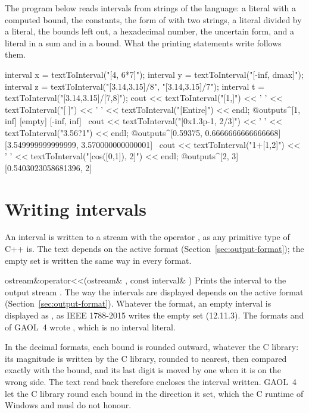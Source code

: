 \begin{Ex}
The program below reads intervals from strings of the language: a literal
with a computed bound, the constants, the form of 
with two strings, a literal divided by a literal, the bounds left out, a
hexadecimal number, the uncertain form, and a literal in a sum and in a
bound. What the printing statements write follows them.
\begin{example}
interval x = textToInterval("[4, 6*7]");
interval y = textToInterval("[-inf, dmax]");
interval z = textToInterval("[3.14,3.15]/8", "[3.14,3.15]/7");
interval t = textToInterval("[3.14,3.15]/[7,8]");
cout << textToInterval("[1,]") << ' ' << textToInterval("[ ]") << ' '
     << textToInterval("[Entire]") << endl;
@outputs^[1, inf] [empty] [-inf, inf]~
cout << textToInterval("[0x1.3p-1, 2/3]") << ' '
     << textToInterval("3.56?1") << endl;
@outputs^[0.59375, 0.6666666666666668] [3.549999999999999, 3.570000000000001]~
cout << textToInterval("1+[1,2]") << ' '
     << textToInterval("[cos([0,1]), 2]") << endl;
@outputs^[2, 3] [0.5403023058681396, 2]~
\end{example}
\end{Ex}

\section{Writing intervals}\label{sec:writing}

An interval is written to a stream with the operator \code{<{}<}, as any
primitive type of C++ is. The text depends on the active format
(Section~\ref{sec:output-format}); the empty set is written the same way in
every format.
%

\begin{deffun}{ostream\&}{operator<{}<}{(ostream\& , const interval\& )}
  Prints the interval  to the output stream . The way the
  intervals are displayed depends on the active format
  (Section~\ref{sec:output-format}). Whatever the format, an empty interval
  is displayed as \code{[empty]}, as IEEE 1788-2015 writes the empty set
  (12.11.3).\newinvfive{} The formats  and 
  of GAOL~4 wrote , which is no interval literal.
\end{deffun}

\noindent
In the decimal formats, each bound is rounded outward, whatever the C
library: its magnitude is written by the C library, rounded to nearest, then
compared exactly with the bound, and its last digit is moved by one when it
is on the wrong side. The text read back therefore encloses the interval
written.\newinvfive{} GAOL~4 let the C library round each bound in the
direction it set, which the C runtime of Windows and musl do not honour.

